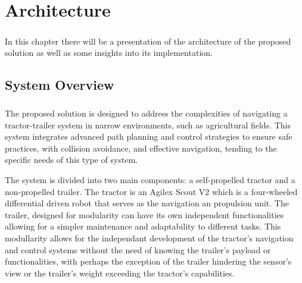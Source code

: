 
%

\chapter{Architecture}
\label{cha:architecture}

\paragraph{}In this chapter there will be a presentation of the architecture of the proposed solution as well as some insights into its 
implementation.

\section{System Overview}
\label{sec:systemoverview}
\paragraph{}The proposed solution is designed to address the complexities of navigating a 
tractor-trailer system in narrow environments, such as agricultural fields. This system integrates 
advanced path planning and control strategies to ensure safe practices, with collision avoidance, and 
effective navigation, tending to the specific needs of this type of system.

The system is divided into two main components: a self-propelled tractor and a non-propelled trailer. 
The tractor is an Agilex Scout V2 which is a four-wheeled differential driven robot that serves as the 
navigation an propulsion unit. The trailer, designed for modularity can have its own independent functionalities 
allowing for a simpler maintenance and adaptability to different tasks. This modullarity allows 
for the independant development of the tractor's navigation and control systems without 
the need of knowing the trailer's payload or functionalities, with perhaps the exception 
of the trailer hindering the sensor's view or the trailer's weight exceeding the 
tractor's capabilities.

